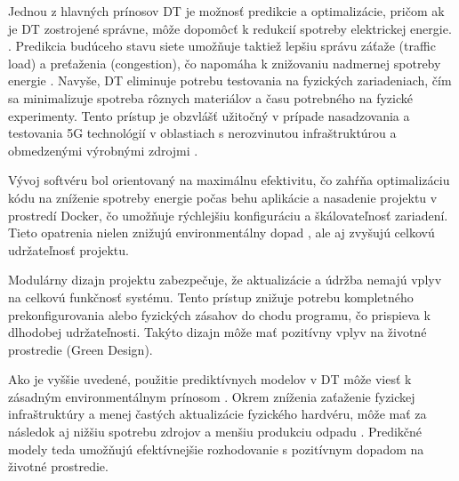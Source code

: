 \par{
Jednou z hlavných prínosov DT je možnosť predikcie a optimalizácie, pričom ak je DT zostrojené správne, môže dopomôcť k redukcií spotreby elektrickej energie. \cite{DT_edge_networks_IoT}. Predikcia budúceho stavu siete umožňuje taktiež lepšiu správu záťaže (traffic load) a preťaženia (congestion), čo napomáha k znižovaniu nadmernej spotreby energie \cite{malaysia_enviro}. Navyše, DT eliminuje potrebu testovania na fyzických zariadeniach, čím sa minimalizuje spotreba rôznych materiálov \cite{enviro_raw_materials} a času potrebného na fyzické experimenty. Tento prístup je obzvlášť užitočný v prípade nasadzovania a testovania 5G technológií v oblastiach s nerozvinutou infraštruktúrou a obmedzenými výrobnými zdrojmi \cite{huaweii_i_cities}.
}

\par{
Vývoj softvéru bol orientovaný na maximálnu efektivitu, čo zahŕňa optimalizáciu kódu na zníženie spotreby energie počas behu aplikácie a nasadenie projektu v prostredí Docker, čo umožňuje rýchlejšiu konfiguráciu a škálovateľnosť zariadení. Tieto opatrenia nielen znižujú environmentálny dopad \cite{docker_enviro}\cite{docker_enviro_2}, ale aj zvyšujú celkovú udržateľnosť projektu.
}

\par{
Modulárny dizajn \cite{modular_sw} projektu zabezpečuje, že aktualizácie a údržba nemajú vplyv na celkovú funkčnosť systému. Tento prístup znižuje potrebu kompletného prekonfigurovania alebo fyzických zásahov do chodu programu, čo prispieva k dlhodobej udržateľnosti. Takýto dizajn môže mať pozitívny vplyv na životné prostredie \cite{modular_sw} (Green Design).
}

\par{
Ako je vyššie uvedené, použitie prediktívnych modelov v DT môže viesť k zásadným environmentálnym prínosom \cite{enviro}. Okrem zníženia zaťaženie fyzickej infraštruktúry a menej častých aktualizácie fyzického hardvéru, môže mať za následok aj nižšiu spotrebu zdrojov a menšiu produkciu odpadu \cite{enviro_raw_materials}. Predikčné modely teda umožňujú efektívnejšie rozhodovanie s pozitívnym dopadom na životné prostredie.
}

